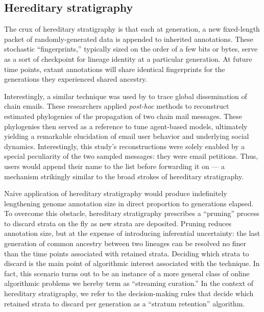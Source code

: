 \subsection{Hereditary stratigraphy}

The crux of hereditary stratigraphy is that each at generation, a new fixed-length packet of randomly-generated data is appended to inherited annotations.
These stochastic ``fingerprints,'' typically sized on the order of a few bits or bytes, serve as a sort of checkpoint for lineage identity at a particular generation.
At future time points, extant annotations will share identical fingerprints for the generations they experienced shared ancestry.

Interestingly, a similar technique was used by \cite{libennowell2008tracing} to trace global dissemination of chain emails.
These researchers applied \textit{post-hoc} methods to reconstruct estimated phylogenies of the propagation of two chain mail messages.
These phylogenies then served as a reference to tune agent-based models, ultimately yielding a remarkable elucidation of email user behavior and underlying social dynamics.
Interestingly, this study's reconstructions were solely enabled by a special peculiarity of the two sampled messages: they were email petitions.
Thus, users would append their name to the list before forwarding it on --- a mechanism strikingly similar to the broad strokes of hereditary stratigraphy.

Naive application of hereditary stratigraphy would produce indefinitely lengthening genome annotation size in direct proportion to generations elapsed.
To overcome this obstacle, hereditary stratigraphy prescribes a ``pruning'' process to discard strata on the fly as new strata are deposited.
Pruning reduces annotation size, but at the expense of introducing inferential uncertainty: the last generation of common ancestry between two lineages can be resolved no finer than the time points associated with retained strata.
Deciding which strata to discard is the main point of algorithmic interest associated with the technique.
In fact, this scenario turns out to be an instance of a more general class of online algorithmic problems we hereby term as ``streaming curation.''
In the context of hereditary stratigraphy, we refer to the decision-making rules that decide which retained strata to discard per generation as a ``stratum retention'' algorithm.

